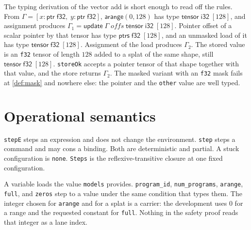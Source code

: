 \documentclass[a4paper,UKenglish,anonymous,cleveref,autoref]{lipics-v2021}
\begin{document}
The typing derivation of the vector add is short enough to read off the rules.
From \(\Gamma = [x : \mathsf{ptr}\;\mathsf{f32},\; y : \mathsf{ptr}\;\mathsf{f32}]\),
\(\mathsf{arange}(0,128)\) has type \(\mathsf{tensor}\;\mathsf{i32}\;[128]\), and assignment produces \(\Gamma_1 = \mathsf{update}\;\Gamma\;\mathit{offs}\;\mathsf{tensor}\;\mathsf{i32}\;[128]\).
Pointer offset of a scalar pointer by that tensor has type \(\mathsf{ptrs}\;\mathsf{f32}\;[128]\), and an unmasked load of it has type \(\mathsf{tensor}\;\mathsf{f32}\;[128]\).
Assignment of the load produces \(\Gamma_2\).
The stored value is an \texttt{f32} tensor of length \(128\) added to a splat of the same shape, still \(\mathsf{tensor}\;\mathsf{f32}\;[128]\).
\texttt{storeOk} accepts a pointer tensor of that shape together with that value, and the store returns \(\Gamma_2\).
The masked variant with an \texttt{f32} mask fails at \cref{def:mask} and nowhere else: the pointer and the \texttt{other} value are well typed.

\section{Operational semantics}
\label{sec:triton-step}

\texttt{stepE} steps an expression and does not change the environment.
\texttt{step} steps a command and may cons a binding.
Both are deterministic and partial.
A stuck configuration is \texttt{none}.
\texttt{Steps} is the reflexive-transitive closure at one fixed configuration.

A variable loads the value \texttt{models} provides.
\texttt{program\_id}, \texttt{num\_programs}, \texttt{arange}, \texttt{full}, and \texttt{zeros} step to a value under the same condition that types them.
The integer chosen for \texttt{arange} and for a splat is a carrier: the development uses \(0\) for a range and the requested constant for \texttt{full}.
Nothing in the safety proof reads that integer as a lane index.
\end{document}
